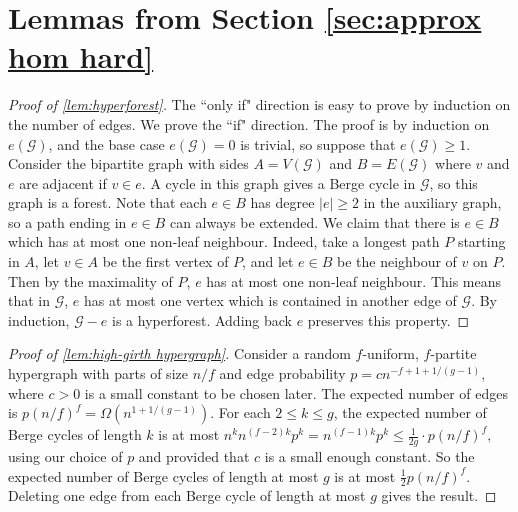 \documentclass[reqno, english, 12pt]{amsart}
\theoremstyle{plain}
\theoremstyle{remark}
\renewcommand{\leq}{\leqslant}
\renewcommand{\geq}{\geqslant}
\begin{document}
	\appendix

	\section{Lemmas from Section \ref{sec:approx hom hard}}\label{sec:F-tree}
	   
	\begin{proof}[Proof of \cref{lem:hyperforest}]
		The ``only if" direction is easy to prove by induction on the number of edges. We prove the ``if" direction. The proof is by induction on $e(\mathcal{G})$, and the base case $e(\mathcal{G}) = 0$ is trivial, so suppose that $e(\mathcal{G}) \geq 1$. Consider the bipartite graph with sides $A = V(\mathcal{G})$ and $B = E(\mathcal{G})$ where $v$ and $e$ are adjacent if $v \in e$. A cycle in this graph gives a Berge cycle in $\mathcal{G}$, so this graph is a forest. 
		Note that each $e \in B$ has degree $|e| \geq 2$ in the auxiliary graph, so a path ending in $e \in B$ can always be extended. 
		We claim that there is $e \in B$ which has at most one non-leaf neighbour. Indeed, take a longest path $P$ starting in $A$, let $v \in A$ be the first vertex of $P$, and let $e \in B$ be the neighbour of $v$ on $P$.  
		Then by the maximality of $P$, $e$ has at most one non-leaf neighbour. This means that in $\mathcal{G}$, $e$ has at most one vertex which is contained in another edge of $\mathcal{G}$. By induction, $\mathcal{G} - e$ is a hyperforest. Adding back $e$ preserves this property.
	\end{proof}

	\begin{proof}[Proof of \cref{lem:high-girth hypergraph}]
		Consider a random $f$-uniform, $f$-partite hypergraph with parts of size $n/f$ and edge probability $p = cn^{-f+1+1/(g-1)}$, where $c > 0$ is a small constant to be chosen later. The expected number of edges is {$p(n/f)^f = \Omega(n^{1+1/(g-1)})$.} For each $2 \leq k \leq g$, the expected number of Berge cycles of length $k$ is at most 
		$
		n^k n^{(f-2)k} p^k = n^{(f-1)k}p^k \leq \frac{1}{2g} \cdot p(n/f)^f,
		$ 
		using our choice of $p$ and provided that $c$ is a small enough constant. 
		So the expected number of Berge cycles of length at most $g$ is at most $\frac{1}{2}p(n/f)^f$.
		Deleting one edge from each Berge cycle of length at most $g$ gives the result. 
	\end{proof}
\end{document}
